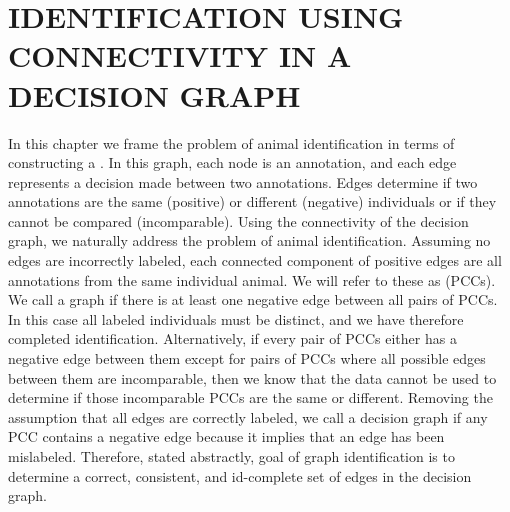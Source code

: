 \begin{comment}
fixtex --fpaths chapter5-graphid.tex --outline --asmarkdown --numlines=999 --shortcite

fixtex --fpaths chapter5-graphid.tex --outline --asmarkdown --numlines=999 --shortcite -w && ./checklang.py outline_chapter5-graphid.md

fixtex --fpaths chapter1-intro.tex --outline --asmarkdown --numlines=999 --shortcite -w && ./checklang.py outline_chapter1-intro.md
\end{comment}



\chapter{IDENTIFICATION USING CONNECTIVITY IN A DECISION GRAPH}\label{chap:graphid}
\newcommand{\nT}{N}

In this chapter we frame the problem of animal identification in terms of constructing a %
.
In this graph, each node is an annotation, and each edge represents a decision made between two annotations.
Edges determine if two annotations are the same (positive) or different (negative) individuals or if they cannot
  be compared (incomparable).
Using the connectivity of the decision graph, we naturally address the problem of animal identification.
Assuming no edges are incorrectly labeled, each connected component of positive edges are all annotations from
  the same individual animal.
We will refer to these as  (PCCs).
We call a graph  if there is at least one negative edge between all pairs of PCCs.
In this case all labeled individuals must be distinct, and we have therefore completed identification.
Alternatively, if every pair of PCCs either has a negative edge between them except for pairs of PCCs where all
  possible edges between them are incomparable, then we know that the data cannot be used to determine if those
  incomparable PCCs are the same or different.
Removing the assumption that all edges are correctly labeled, we call a decision graph 
  if any PCC contains a negative edge because it implies that an edge has been mislabeled.
Therefore, stated abstractly, goal of graph identification is to determine a correct, consistent, and id-complete
  set of edges in the decision graph.



